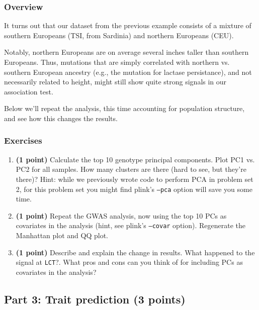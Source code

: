 \documentclass[12pt]{article}
\begin{document}
\subsubsection*{Overview}

It turns out that our dataset from the previous example consists of a mixture of southern Europeans (TSI, from Sardinia) and northern Europeans (CEU). 

Notably, northern Europeans are on average several inches taller than southern Europeans. 
Thus, mutations that are simply correlated with northern vs. southern European ancestry (e.g., the mutation for lactase persistance), and not necessarily related to height, might still show quite strong signals in our association test.

Below we'll repeat the analysis, this time accounting for population structure, and see how this changes the results.

\subsubsection*{Exercises}
\begin{enumerate}

\item \textbf{(1 point)} Calculate the top 10 genotype principal components. Plot PC1 vs. PC2 for all samples. How many clusters are there (hard to see, but they're there)? Hint: while we previously wrote code to perform PCA in problem set 2, for this problem set you might find plink's \texttt{--pca} option will save you some time.

\item \textbf{(1 point)} Repeat the GWAS analysis, now using the top 10 PCs as covariates in the analysis (hint, see plink's \texttt{--covar} option). Regenerate the Manhattan plot and QQ plot.

\item \textbf{(1 point)} Describe and explain the change in results. What happened to the signal at \texttt{LCT}?. What pros and cons can you think of for including PCs as covariates in the analysis?

\end{enumerate}

\subsection*{Part 3: Trait prediction (3 points)}
\end{document}
